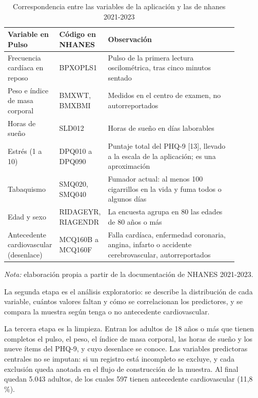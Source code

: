 \documentclass[conference]{IEEEtran}
\begin{document}
\begin{table}[!t]
\centering
\caption{Correspondencia entre las variables de la aplicación y las de nhanes 2021-2023}
\footnotesize
\renewcommand{\arraystretch}{1.15}
\begin{tabular}{>{\raggedright\arraybackslash}p{0.191\linewidth}>{\raggedright\arraybackslash}p{0.120\linewidth}>{\raggedright\arraybackslash}p{0.579\linewidth}}
\hline
\textbf{Variable en Pulso} & \textbf{Código en NHANES} & \textbf{Observación} \\ \hline
Frecuencia cardíaca en reposo & BPXOPLS1 & Pulso de la primera lectura oscilométrica, tras cinco minutos sentado \\ \hline
Peso e índice de masa corporal & BMXWT, BMXBMI & Medidos en el centro de examen, no autorreportados \\ \hline
Horas de sueño & SLD012 & Horas de sueño en días laborables \\ \hline
Estrés (1 a 10) & DPQ010 a DPQ090 & Puntaje total del PHQ-9 [13], llevado a la escala de la aplicación; es una aproximación \\ \hline
Tabaquismo & SMQ020, SMQ040 & Fumador actual: al menos 100 cigarrillos en la vida y fuma todos o algunos días \\ \hline
Edad y sexo & RIDAGEYR, RIAGENDR & La encuesta agrupa en 80 las edades de 80 años o más \\ \hline
Antecedente cardiovascular (desenlace) & MCQ160B a MCQ160F & Falla cardíaca, enfermedad coronaria, angina, infarto o accidente cerebrovascular, autorreportados \\ \hline
\end{tabular}
\par\smallskip\parbox{\linewidth}{\scriptsize\textit{Nota:} elaboración propia a partir de la documentación de NHANES 2021-2023.}
\end{table}
La segunda etapa es el análisis exploratorio: se describe la distribución de cada variable, cuántos valores faltan y cómo se correlacionan los predictores, y se compara la muestra según tenga o no antecedente cardiovascular.

La tercera etapa es la limpieza. Entran los adultos de 18 años o más que tienen completos el pulso, el peso, el índice de masa corporal, las horas de sueño y los nueve ítems del PHQ-9, y cuyo desenlace se conoce. Las variables predictoras centrales no se imputan: si un registro está incompleto se excluye, y cada exclusión queda anotada en el flujo de construcción de la muestra. Al final quedan 5.043 adultos, de los cuales 597 tienen antecedente cardiovascular (11{,}8 \%).
\end{document}
